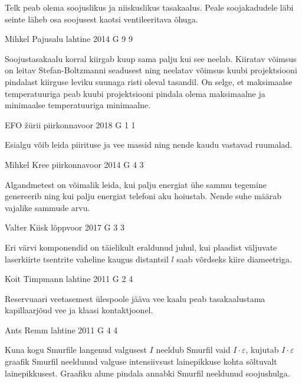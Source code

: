 \documentclass[11pt]{article}
\begin{document}
{{\ifHint
Telk peab olema soojuslikus ja niiskuslikus tasakaalus. Peale soojakadudele läbi seinte läheb osa soojusest kaotsi ventileeritava õhuga.
\fi
}

{Mihkel Pajusalu} %
{lahtine} %
{2014} %
{G 9} %
{9} %
{

\ifHint
Soojustasakaalu korral kiirgab kuup sama palju kui see neelab. Kiiratav võimsus on leitav Stefan-Boltzmanni seadusest ning neelatav võimsus kuubi projektsiooni pindalast kiirguse leviku suunaga risti oleval tasandil. On selge, et maksimaalse temperatuuriga peab kuubi projektsiooni pindala olema maksimaalne ja minimaalse temperatuuriga minimaalne.
\fi
}

{EFO žürii} %
{piirkonnavoor} %
{2018} %
{G 1} %
{1} %
{

\ifHint
Esialgu võib leida piirituse ja vee massid ning nende kaudu vastavad ruumalad.
\fi
}

{Mihkel Kree} %
{piirkonnavoor} %
{2014} %
{G 4} %
{3} %
{

\ifHint
Algandmetest on võimalik leida, kui palju energiat ühe sammu tegemine genereerib ning kui palju energiat telefoni aku hoiustab. Nende suhe määrab vajalike sammude arvu.
\fi
}

{Valter Kiisk} %
{lõppvoor} %
{2017} %
{G 3} %
{3} %
{

\ifHint
Eri värvi komponendid on täielikult eraldunud juhul, kui plaadist väljuvate laserkiirte tsentrite vaheline kaugus distantsil $l$ saab võrdseks kiire diameetriga.
\fi
}

{Koit Timpmann} %
{lahtine} %
{2011} %
{G 2} %
{4} %
{

\ifHint
Reservuaari veetasemest ülespoole jääva vee kaalu peab tasakaalustama kapillaarjõud vee ja klaasi kontaktjoonel.
\fi
}

{Ants Remm} %
{lahtine} %
{2011} %
{G 4} %
{4} %
{

\ifHint
Kuna kogu Smurfile langenud valgusest $I$ neeldub Smurfil vaid $ I \cdot\varepsilon $, kujutab $ I \cdot \varepsilon $ graafik Smurfil neeldunud valguse intensiivsust lainepikkuse kohta sõltuvalt lainepikkusest. Graafiku alune pindala annabki Smurfil neeldunud soojushulga. 
\fi
}

}
\end{document}
